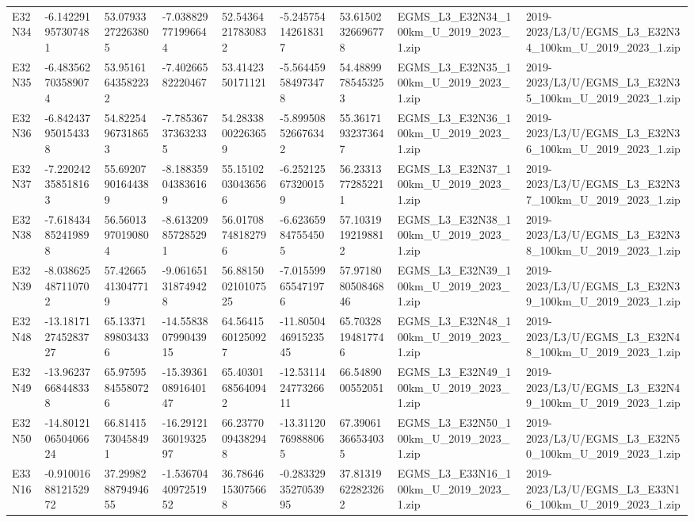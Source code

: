 \begin{landscape}
\begin{longtable}{lllllllll}
E32N34 & -6.142291957307481 & 53.07933272263805 & -7.038829771996644 & 52.54364217830832 & -5.245754142618317 & 53.61502326696778 & EGMS\_L3\_E32N34\_100km\_U\_2019\_2023\_1.zip & 2019-2023/L3/U/EGMS\_L3\_E32N34\_100km\_U\_2019\_2023\_1.zip \\
E32N35 & -6.483562703589074 & 53.95161643582232 & -7.40266582220467 & 53.4142350171121 & -5.564459584973478 & 54.48899785453253 & EGMS\_L3\_E32N35\_100km\_U\_2019\_2023\_1.zip & 2019-2023/L3/U/EGMS\_L3\_E32N35\_100km\_U\_2019\_2023\_1.zip \\
E32N36 & -6.842437950154338 & 54.82254967318653 & -7.785367373632335 & 54.28338002263659 & -5.899508526676342 & 55.36171932373647 & EGMS\_L3\_E32N36\_100km\_U\_2019\_2023\_1.zip & 2019-2023/L3/U/EGMS\_L3\_E32N36\_100km\_U\_2019\_2023\_1.zip \\
E32N37 & -7.220242358518163 & 55.69207901644389 & -8.188359043836169 & 55.15102030436566 & -6.252125673200159 & 56.23313772852211 & EGMS\_L3\_E32N37\_100km\_U\_2019\_2023\_1.zip & 2019-2023/L3/U/EGMS\_L3\_E32N37\_100km\_U\_2019\_2023\_1.zip \\
E32N38 & -7.618434852419898 & 56.56013970190804 & -8.613209857285291 & 56.01708748182796 & -6.623659847554505 & 57.10319192198812 & EGMS\_L3\_E32N38\_100km\_U\_2019\_2023\_1.zip & 2019-2023/L3/U/EGMS\_L3\_E32N38\_100km\_U\_2019\_2023\_1.zip \\
E32N39 & -8.038625487110702 & 57.42665413047719 & -9.061651318749428 & 56.881500210107525 & -7.015599655471976 & 57.971808050846846 & EGMS\_L3\_E32N39\_100km\_U\_2019\_2023\_1.zip & 2019-2023/L3/U/EGMS\_L3\_E32N39\_100km\_U\_2019\_2023\_1.zip \\
E32N48 & -13.181712745283727 & 65.13371898034336 & -14.558380799043915 & 64.56415601250927 & -11.805044691523545 & 65.70328194817746 & EGMS\_L3\_E32N48\_100km\_U\_2019\_2023\_1.zip & 2019-2023/L3/U/EGMS\_L3\_E32N48\_100km\_U\_2019\_2023\_1.zip \\
E32N49 & -13.96237668448338 & 65.97595845580726 & -15.393610891640147 & 65.40301685640942 & -12.531142477326611 & 66.5489000552051 & EGMS\_L3\_E32N49\_100km\_U\_2019\_2023\_1.zip & 2019-2023/L3/U/EGMS\_L3\_E32N49\_100km\_U\_2019\_2023\_1.zip \\
E32N50 & -14.801210650406624 & 66.81415730458491 & -16.291213601932597 & 66.23770094382948 & -13.31120769888065 & 67.39061366534035 & EGMS\_L3\_E32N50\_100km\_U\_2019\_2023\_1.zip & 2019-2023/L3/U/EGMS\_L3\_E32N50\_100km\_U\_2019\_2023\_1.zip \\
E33N16 & -0.9100168812152972 & 37.299828879494655 & -1.5367044097251952 & 36.78646153075668 & -0.2833293527053995 & 37.81319622823262 & EGMS\_L3\_E33N16\_100km\_U\_2019\_2023\_1.zip & 2019-2023/L3/U/EGMS\_L3\_E33N16\_100km\_U\_2019\_2023\_1.zip \\

\end{longtable}
\end{landscape}
